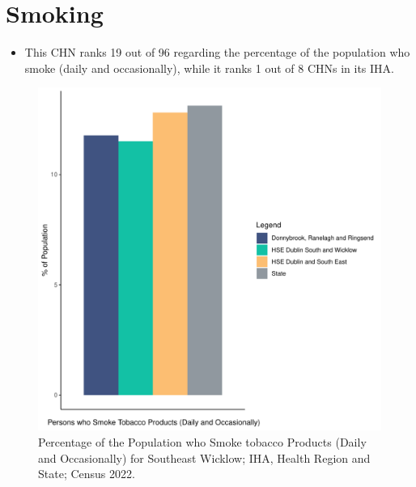 \documentclass{article}
\begin{document}
\pagebreak

\section{Smoking}\label{sect:Smoking}
\begin{itemize}
\item This CHN ranks  19 out of 96 regarding the percentage of the population who smoke (daily and occasionally), while it ranks   1 out of 8 CHNs in its IHA.
\end{itemize}
\begin{figure}[H]
	\centering
	\includegraphics[width = 120mm]{../figures/SmokingED.pdf}
	\caption{Percentage of the Population who Smoke tobacco Products (Daily and Occasionally) for Southeast Wicklow; IHA, Health Region and State; Census 2022.}
	\label{fig:2ae19629-1a6a-13a3-e055-000000000001}
	\end{figure}
	
\end{document}
